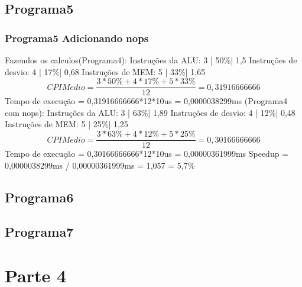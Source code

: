 \documentclass{article}
\begin{document}
\subsection{Programa5}

\newpage

\subsubsection{Programa5 Adicionando nops}

\newpage
Fazendos os calculos(Programa4):
\newline
Instruções da ALU:    3 | 50\%| 1,5
\newline
Instruções de desvio: 4 | 17\%| 0,68
\newline
Instruções de MEM:    5 | 33\%| 1,65
\newline
\begin{equation}
CPI Medio = \frac{3*50\%+4*17\%+5*33\%}{12} = 0,31916666666
\end{equation}
\newline
Tempo de execução = 0,31916666666*12*10us = 0,0000038299ms
\newline
\newline
(Programa4 com nops):
\newline
Instruções da ALU:    3 | 63\%| 1,89
\newline
Instruções de desvio: 4 | 12\%| 0,48
\newline
Instruções de MEM:    5 | 25\%| 1,25
\newline
\begin{equation}
CPI Medio = \frac{3*63\%+4*12\%+5*25\%}{12} = 0,30166666666
\end{equation}
\newline
Tempo de execução = 0,30166666666*12*10us = 0,00000361999ms
\newline
Speedup = 0,0000038299ms / 0,00000361999ms = 1,057 = 5,7\%
\newpage
\subsection{Programa6}

\newpage

\subsection{Programa7}

\newpage

\section{Parte 4}
\end{document}
